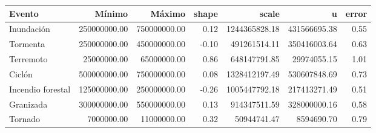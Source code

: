 \begin{table}[ht]
\centering
\begin{tabular}{lrrrrrr}
  \hline
Evento & Mínimo & Máximo & shape & scale & u & error \\ 
  \hline
Inundación & 250000000.00 & 750000000.00 & 0.12 & 1244365828.18 & 431566695.38 & 0.55 \\ 
  Tormenta & 250000000.00 & 450000000.00 & -0.10 & 491261514.11 & 350416003.64 & 0.63 \\ 
  Terremoto & 25000000.00 & 65000000.00 & 0.86 & 648147791.85 & 29974055.15 & 1.01 \\ 
  Ciclón & 500000000.00 & 750000000.00 & 0.08 & 1328412197.49 & 530607848.69 & 0.73 \\ 
  Incendio forestal & 125000000.00 & 250000000.00 & -0.26 & 1005447792.18 & 217413271.49 & 0.51 \\ 
  Granizada & 300000000.00 & 550000000.00 & 0.13 & 914347511.59 & 328000000.16 & 0.58 \\ 
  Tornado & 7000000.00 & 11000000.00 & 0.32 & 50944741.47 & 8594690.70 & 0.79 \\ 
   \hline
\end{tabular}
\end{table}

